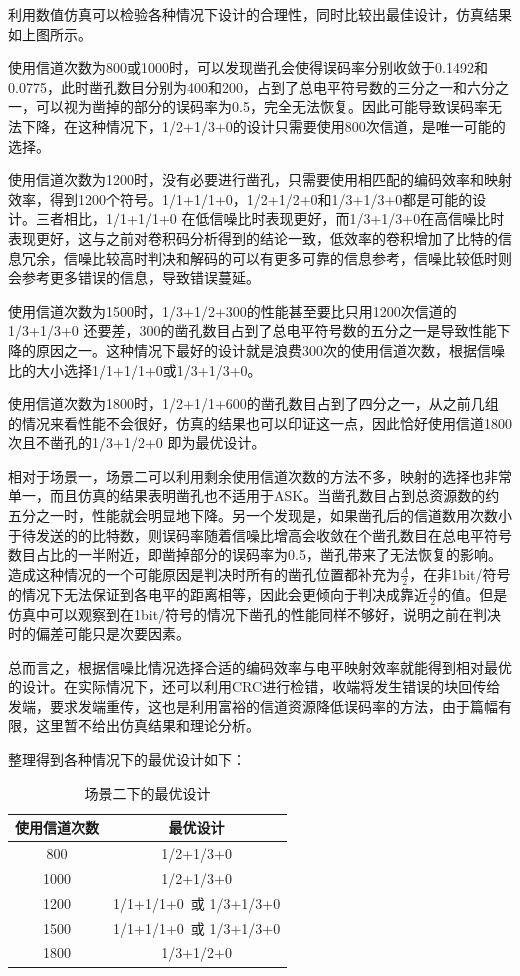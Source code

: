 利用数值仿真可以检验各种情况下设计的合理性，同时比较出最佳设计，仿真结果如上图所示。

使用信道次数为800或1000时，可以发现凿孔会使得误码率分别收敛于0.1492和0.0775，此时凿孔数目分别为400和200，占到了总电平符号数的三分之一和六分之一，可以视为凿掉的部分的误码率为0.5，完全无法恢复。因此可能导致误码率无法下降，在这种情况下，1/2+1/3+0的设计只需要使用800次信道，是唯一可能的选择。
    
使用信道次数为1200时，没有必要进行凿孔，只需要使用相匹配的编码效率和映射效率，得到1200个符号。1/1+1/1+0，1/2+1/2+0和1/3+1/3+0都是可能的设计。三者相比，1/1+1/1+0 在低信噪比时表现更好，而1/3+1/3+0在高信噪比时表现更好，这与之前对卷积码分析得到的结论一致，低效率的卷积增加了比特的信息冗余，信噪比较高时判决和解码的可以有更多可靠的信息参考，信噪比较低时则会参考更多错误的信息，导致错误蔓延。

使用信道次数为1500时，1/3+1/2+300的性能甚至要比只用1200次信道的1/3+1/3+0 还要差，300的凿孔数目占到了总电平符号数的五分之一是导致性能下降的原因之一。这种情况下最好的设计就是浪费300次的使用信道次数，根据信噪比的大小选择1/1+1/1+0或1/3+1/3+0。
    
使用信道次数为1800时，1/2+1/1+600的凿孔数目占到了四分之一，从之前几组的情况来看性能不会很好，仿真的结果也可以印证这一点，因此恰好使用信道1800次且不凿孔的1/3+1/2+0 即为最优设计。

相对于场景一，场景二可以利用剩余使用信道次数的方法不多，映射的选择也非常单一，而且仿真的结果表明凿孔也不适用于ASK。当凿孔数目占到总资源数的约五分之一时，性能就会明显地下降。另一个发现是，如果凿孔后的信道数用次数小于待发送的的比特数，则误码率随着信噪比增高会收敛在个凿孔数目在总电平符号数目占比的一半附近，即凿掉部分的误码率为0.5，凿孔带来了无法恢复的影响。造成这种情况的一个可能原因是判决时所有的凿孔位置都补充为$\frac{A}{2}$，在非1bit/符号的情况下无法保证到各电平的距离相等，因此会更倾向于判决成靠近$\frac{A}{2}$的值。但是仿真中可以观察到在1bit/符号的情况下凿孔的性能同样不够好，说明之前在判决时的偏差可能只是次要因素。

总而言之，根据信噪比情况选择合适的编码效率与电平映射效率就能得到相对最优的设计。在实际情况下，还可以利用CRC进行检错，收端将发生错误的块回传给发端，要求发端重传，这也是利用富裕的信道资源降低误码率的方法，由于篇幅有限，这里暂不给出仿真结果和理论分析。

整理得到各种情况下的最优设计如下：
\begin{table}[h]
    \centering
    \small
    \begin{tabular}	{|c|c|}
        \hline
            使用信道次数&最优设计 \\ 
        \hline
            800& 1/2+1/3+0\\
            1000& 1/2+1/3+0\\
            1200& 1/1+1/1+0\ 或 1/3+1/3+0\\
            1500& 1/1+1/1+0\ 或 1/3+1/3+0\\
            1800& 1/3+1/2+0\\
        \hline
    \end{tabular}
    \caption{场景二下的最优设计}
\end{table}

